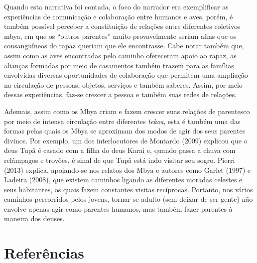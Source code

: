 Quando esta narrativa foi contada, o foco do narrador era exemplificar
as experiências de comunicação e colaboração entre humanos e aves,
porém, é também possível perceber a constituição de relações entre
diferentes coletivos mbya, em que os ``outros parentes'' muito
provavelmente seriam afins que os consanguíneos do rapaz queriam que
ele encontrasse. Cabe notar também que, assim como as aves encontradas
pelo caminho ofereceram apoio ao rapaz, as alianças formadas por meio
de casamentos também trazem para as famílias envolvidas diversas
oportunidades de colaboração que permitem uma ampliação na circulação
de pessoas, objetos, serviços e também saberes. Assim, por meio dessas
experiências, faz-se crescer a pessoa e também suas redes de relações.

Ademais, assim como os Mbya criam e fazem crescer suas relações de
parentesco por meio de intensa circulação entre diferentes \emph{tekoa}, esta
é também uma das formas pelas quais os Mbya se aproximam dos modos de
agir dos seus parentes divinos. Por exemplo, um dos interlocutores de
Montardo (2009) explicou que o deus Tupã é casado com a filha do deus
Karai e, quando passa a chuva com relâmpagos e trovões, é sinal de que
Tupã está indo visitar seu sogro. Pierri (2013) explica, apoiando-se
nos relatos dos Mbya e autores como Garlet (1997) e Ladeira (2008), que
existem caminhos ligando as diferentes moradas celestes e seus
habitantes, os quais fazem constantes visitas recíprocas. Portanto, nos
vários caminhos percorridos pelos jovens, tornar-se adulto (sem deixar
de ser gente) não envolve apenas agir como parentes humanos, mas também
fazer parentes à maneira dos deuses.

\section{Referências}

